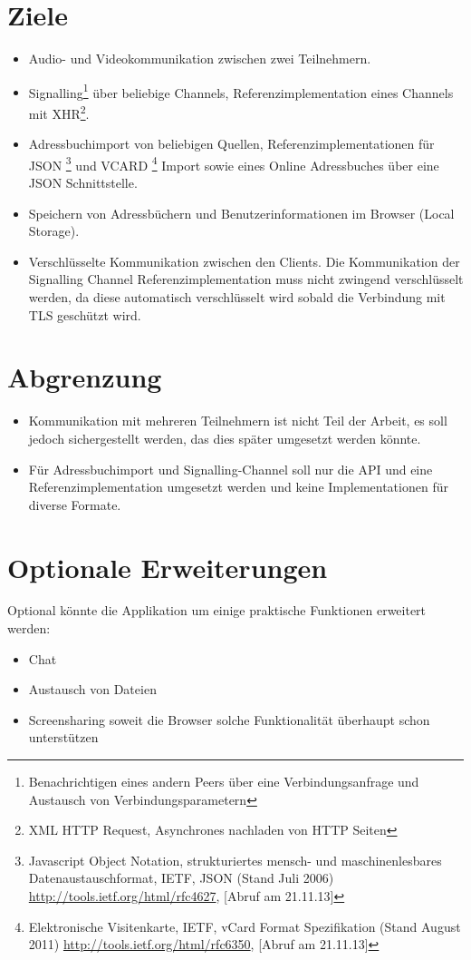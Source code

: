 	\section{Ziele}
		\begin{itemize}
			\item Audio- und Videokommunikation zwischen zwei Teilnehmern.
			\item Signalling\footnote{Benachrichtigen eines andern Peers über eine Verbindungsanfrage und Austausch von Verbindungsparametern} über beliebige Channels, Referenzimplementation eines Channels mit XHR\footnote{XML HTTP Request, Asynchrones nachladen von HTTP Seiten}.
			\item Adressbuchimport von beliebigen Quellen, Referenzimplementationen für JSON
				\footnote{Javascript Object Notation, strukturiertes mensch- und maschinenlesbares Datenaustauschformat, 
					IETF, JSON (Stand Juli 2006)
					\hyperlink{http://tools.ietf.org/html/rfc4627}{http://tools.ietf.org/html/rfc4627}, [Abruf am 21.11.13]
				} und VCARD
				\footnote{Elektronische Visitenkarte, IETF, vCard Format Spezifikation (Stand August 2011) 
					\hyperlink{http://tools.ietf.org/html/rfc6350}{http://tools.ietf.org/html/rfc6350}, [Abruf am 21.11.13]
				} Import sowie eines Online Adressbuches über eine JSON Schnittstelle.
			\item Speichern von Adressbüchern und Benutzerinformationen im Browser (Local Storage).
			\item Verschlüsselte Kommunikation zwischen den Clients. Die Kommunikation der Signalling Channel Referenzimplementation muss nicht zwingend verschlüsselt werden, da diese automatisch verschlüsselt wird sobald die Verbindung mit TLS geschützt wird.
		\end{itemize}
		
	\section{Abgrenzung}
		\begin{itemize}
			\item Kommunikation mit mehreren Teilnehmern ist nicht Teil der Arbeit, es soll jedoch sichergestellt werden, das dies später umgesetzt werden könnte.
			\item Für Adressbuchimport und Signalling-Channel soll nur die API und eine
			Referenzimplementation umgesetzt werden und keine Implementationen für diverse Formate.
		\end{itemize}
		
	\section{Optionale Erweiterungen}
		Optional könnte die Applikation um einige praktische Funktionen erweitert werden:		
		\begin{itemize}
			\item Chat
			\item Austausch von Dateien
			\item Screensharing soweit die Browser solche Funktionalität überhaupt schon unterstützen
		\end{itemize}